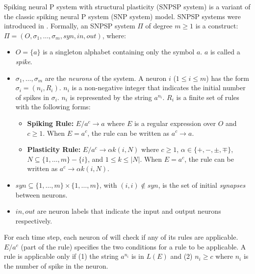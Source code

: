 \documentclass[smallextended]{svjour3}
\begin{document}
\begin{definition}

Spiking neural P system with structural plasticity (SNPSP system) is a variant of the classic spiking neural P system (SNP system) model. SNPSP 
systems were introduced in \cite{cabarle-2015-structural-plasticity}. Formally, an SNPSP system $\Pi$ of degree $m \geq 1$ is  {a} construct: $\Pi =(O, \sigma_1,\ldots, \sigma_m, 
syn, in, out)$, where:

\begin{itemize}[label=$\circ$]
   \item  $O = \{a\}$ is a singleton alphabet containing only the symbol $a$. $a$ is called a \textit{spike}.
   \item $\sigma_1, \ldots, \sigma_m$ are the \textit{neurons} of the system. A neuron $i$ ($1 \leq i \leq m$) has the form $\sigma_i = (n_i, R_i)$. 
          $n_i$ is a non-negative integer that indicates the initial number of spikes in $\sigma_i$. $n_i$ is represented by the string $a^{n_i}$. 
          $R_i$ is a finite set of rules with the following forms:
          \begin{itemize}
             \item \textbf{Spiking Rule:} $E/a^c \rightarrow a$ where $E$ is a regular expression over $O$ and $c \geq 1$. When $E=a^c$, the rule can 
                   be written as $a^c \rightarrow a$.
             \item \textbf{Plasticity Rule:} $E/a^c \rightarrow \alpha k(i,N)$ where $c \geq 1$, $\alpha \in \{+,-,\pm,\mp\}$, $N \subseteq \{1,
                   \ldots,m\}-\{i\}$, and  $1 \leq k \leq |N|$. When $E=a^c$, the rule can be written as $a^c \rightarrow \alpha k(i,N)$.
          \end{itemize}
   \item $syn \subseteq \{1,\ldots,m\} \times \{1,\ldots,m\}$, with $(i,i) \not\in syn$, is the set of initial \textit{synapses} between neurons.
   \item $in,out$ are neuron labels that indicate the input and output neurons respectively.
\end{itemize}
 
\end{definition}
 

 
For each time step, each neuron of will check if any of its rules are applicable. $E/a^c$ (part of the rule) specifies the two conditions for a rule
to be applicable. A rule is applicable only if (1) the string $a^{n_i}$ is in $L(E)$ and  (2) $n_i \geq c$ where $n_i$ is the number of spike in the
neuron.
\end{document}
